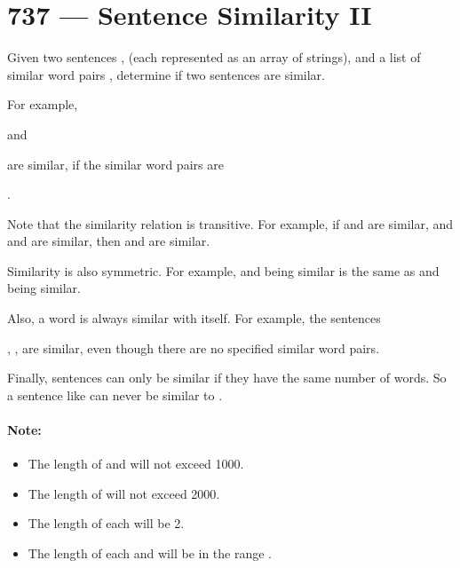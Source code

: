 \section{737 --- Sentence Similarity II}
Given two sentences ,  (each represented as an array of strings), and a list of similar word pairs , determine if two sentences are similar.

For example, 


and 


are similar, if the similar word pairs are 

.

Note that the similarity relation is transitive. For example, if  and  are similar, and  and  are similar, then  and  are similar.

Similarity is also symmetric. For example,  and  being similar is the same as  and  being similar.

Also, a word is always similar with itself. For example, the sentences 

, ,  are similar, even though there are no specified similar word pairs.

Finally, sentences can only be similar if they have the same number of words. So a sentence like  can never be similar to .

\paragraph{Note:}

\begin{itemize}
\item The length of  and  will not exceed 1000.
\item The length of  will not exceed 2000.
\item The length of each  will be 2.
\item The length of each  and  will be in the range \fcj{[1, 20]}.

\end{itemize}